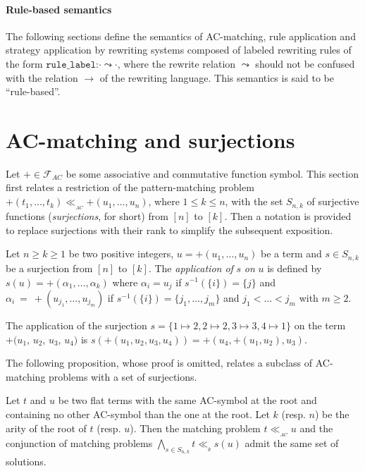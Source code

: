 \documentclass[submission,copyright,creativecommons]{eptcs}
\newcommand \matchth[3]{#1 {\ll}_{{ }_{#3}} {#2}}
\newcommand \rrule[2]{#1\rightarrow #2}
\numberwithin{subcase}{case}
\begin{document}
\paragraph{Rule-based semantics}
The following sections define the semantics of AC-matching, rule application and
strategy application by rewriting systems composed of labeled rewriting rules of
the form $\texttt{rule\_label:} \cdot \leadsto \cdot$, where the rewrite relation
$\leadsto$ should not be confused with the relation $\rrule{}{}$ of the rewriting
language. This semantics is said to be ``rule-based''.


\section{AC-matching and surjections}
\label{surj:sec}
Let $+ \in \mathcal{F}_{AC}$ be some associative and commutative function
symbol. This section first relates a restriction of the pattern-matching problem
$\matchth{+(t_1,\ldots,t_k)}{+(u_1,\ldots,u_n)}{AC}$, where  $1 \le k \le n$,
with the set $S_{n,k}$ of surjective functions (\emph{surjections}, for short)
from $[n]$ to $[k]$.
Then a notation is provided  to replace surjections with their rank to simplify
the subsequent exposition.


\begin{definition}
\label{surj:arrang:def}
Let $n \ge k \ge 1$ be two positive integers, $u=+(u_1,\ldots,u_n)$ be a term
 and $s \in S_{n,k}$ be a surjection from $[n]$ to
 $[k]$. The \emph{application of}
$s$ \emph{on} $u$ is defined by $s(u) =
+(\alpha_1,\ldots,\alpha_k)$ where $\alpha_i= u_j$ if
$s^{-1}(\{i\})=\{j\}$ and $\alpha_i~=~+(u_{j_1},\ldots,
u_{j_m})$ if $s^{-1}(\{i\})=\{j_1,\ldots,j_m\}$ and $j_1 < \ldots < j_m$  with 
$m\ge 2$.
\end{definition}

\begin{example}
\label{surj:appli:ex}
The application of the surjection $s=\{1\mapsto 2, 2 \mapsto 2, 3\mapsto 3, 4
\mapsto 1 \}$ on the term $+(u_1$, $u_2$, $u_3$, $u_4)$ is
 $s(+(u_1,u_2,u_3,u_4))=+(u_4,+(u_1,u_2),u_3)$.
\end{example}

The following proposition, whose proof is omitted, relates a subclass of
AC-matching problems with a set of surjections.
\begin{proposition}
\label{prop:matching:surj}
Let $t$ and $u$ be two flat terms with the same AC-symbol at the root and
containing no other AC-symbol than the one at the root. Let $k$ (resp. $n$) be
the arity of the root of $t$ (resp. $u$). Then the matching problem
$\matchth{t}{u}{AC}$ and the conjunction of matching problems $\bigwedge_{s\in
S_{n,k}} \matchth{t}{ s(u)}{\emptyset}$ admit the same set of solutions.
\end{proposition}
\end{document}
